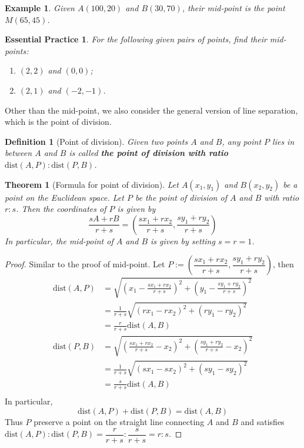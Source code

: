 \documentclass[12pt]{article}
\newtheorem{definition}{Definition}[section]
\newtheorem*{theorem}{Theorem}
\newtheorem*{example}{Example}
\newtheorem{exercise}{Essential Practice}[subsection]
\begin{document}
    \begin{example}
        Given $A(100,20)$ and $B(30,70)$, their mid-point is the point $M(65,45)$.
    \end{example}

    \begin{exercise}
        For the following given pairs of points, find their mid-points:\begin{enumerate}
            \item $(2,2)$ and $(0,0)$;
            \item $(2,1)$ and $(-2,-1)$.
        \end{enumerate}
    \end{exercise}

    Other than the mid-point, we also consider the general version of line separation, which is the point of division.

    \begin{definition}[Point of division]
        Given two points $A$ and $B$, any point $P$ lies in between $A$ and $B$ is called \textbf{the point of division with ratio $\mathrm{dist}(A,P):\mathrm{dist}(P,B)$}.
    \end{definition}

    \begin{theorem}[Formula for point of division]
        Let $A(x_1,y_1)$ and $B(x_2,y_2)$ be a point on the Euclidean space. Let $P$ be the point of division of $A$ and $B$ with ratio $r:s$. Then the coordinates of $P$ is given by $$\frac{sA+rB}{r+s}=(\frac{sx_1+rx_2}{r+s},\frac{sy_1+ry_2}{r+s})$$ In particular, the mid-point of $A$ and $B$ is given by setting $s=r=1$.
    \end{theorem}

    \begin{proof}
        Similar to the proof of mid-point. Let $P:=(\dfrac{sx_1+rx_2}{r+s},\dfrac{sy_1+ry_2}{r+s})$, then\begin{align*}
            \mathrm{dist}(A,P)&=\sqrt{(x_1-\frac{sx_1+rx_2}{r+s})^2+(y_1-\frac{sy_1+ry_2}{r+s})^2}\\
            &=\frac{1}{r+s}\sqrt{(rx_1-rx_2)^2+(ry_1-ry_2)^2}\\
            &=\frac{r}{r+s}\mathrm{dist}(A,B)\\
            \mathrm{dist}(P,B)&=\sqrt{(\frac{sx_1+rx_2}{r+s}-x_2)^2+(\frac{sy_1+ry_2}{r+s}-x_2)^2}\\
            &=\frac{1}{r+s}\sqrt{(sx_1-sx_2)^2+(sy_1-sy_2)^2}\\
            &=\frac{s}{r+s}\mathrm{dist}(A,B)\\
        \end{align*}
        In particular, $$\mathrm{dist}(A,P)+\mathrm{dist}(P,B)=\mathrm{dist}(A,B)$$
        Thus $P$ preserve a point on the straight line connecting $A$ and $B$ and satisfies $\mathrm{dist}(A,P):\mathrm{dist}(P,B)=\dfrac{r}{r+s}:\dfrac{s}{r+s}=r:s$.
    \end{proof}
\end{document}
